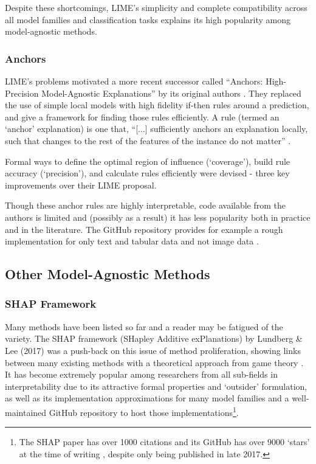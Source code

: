 \documentclass[main]{subfiles}
\begin{document}
Despite these shortcomings, LIME's simplicity and complete compatibility across all model families and classification tasks explains its high popularity among model-agnostic methods.

\subsubsection{Anchors}

LIME's problems motivated a more recent successor called ``Anchors: High-Precision Model-Agnostic Explanations'' by its original authors \cite{anchors}. They replaced the use of simple local models with high fidelity if-then rules around a prediction, and give a framework for finding those rules efficiently. A rule (termed an `anchor' explanation) is one that, ``[...] sufficiently anchors an explanation locally, such that changes to the rest of the features of the instance do not matter'' \cite{anchors}. 

Formal ways to define the optimal region of influence (`coverage'), build rule accuracy (`precision'), and calculate rules efficiently were devised - three key improvements over their LIME proposal.

Though these anchor rules are highly interpretable, code available from the authors is limited and (possibly as a result) it has less popularity both in practice and in the literature. The GitHub repository provides for example a rough implementation for only text and tabular data and not image data \cite{anchorsrepo}.

\subsection{Other Model-Agnostic Methods} \label{sec:othermodelag}

\subsubsection{SHAP Framework} 

Many methods have been listed so far and a reader may be fatigued of the variety. The SHAP framework (SHapley Additive exPlanations) by Lundberg \& Lee (2017) was a push-back on this issue of method proliferation, showing links between many existing methods with a theoretical approach from game theory \cite{shap}. It has become extremely popular among researchers from all sub-fields in interpretability due to its attractive formal properties and `outsider' formulation, as well as its implementation approximations for many model families and a well-maintained GitHub repository to host those implementations\footnote{The SHAP paper has over 1000 citations and its GitHub has over 9000 `stars' at the time of writing \cite{shaprepo}, despite only being published in late 2017.}.
 
\end{document}
